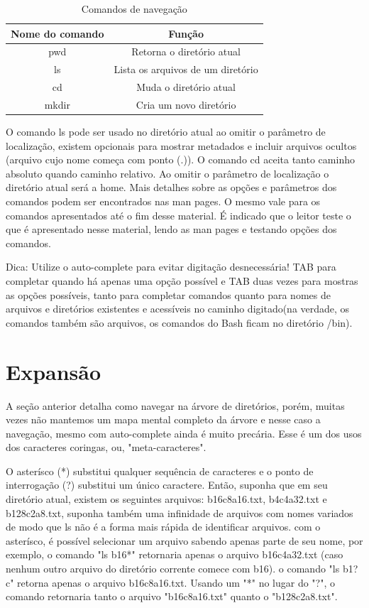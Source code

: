 \documentclass[oneside, 11 pt]{article}
\begin{document}
	\begin{table}[!ht]
		\centering
		\begin{tabular}{ | c | c | } 
			\hline
			\bfseries Nome do comando & \bfseries Função \\
			\hline
			pwd & Retorna o diretório atual \\
			\hline
			ls & Lista os arquivos de um diretório \\
			\hline
			cd & Muda o diretório atual \\
			\hline
			mkdir & Cria um novo diretório \\
			\hline
		\end{tabular}
		\caption{Comandos de navegação}
		\label{table:1}
	\end{table}
	O comando ls pode ser usado no diretório atual ao omitir o parâmetro de localização, existem opcionais para mostrar metadados e incluir arquivos ocultos (arquivo cujo nome começa com ponto (.)). O comando cd aceita tanto caminho absoluto quando caminho relativo. Ao omitir o parâmetro de localização o diretório atual será a home. Mais detalhes sobre as opções e parâmetros dos comandos podem ser encontrados nas man pages. O mesmo vale para os comandos apresentados até o fim desse material. É indicado que o leitor teste o que é apresentado nesse material, lendo as man pages e testando opções dos comandos.
	
	Dica: Utilize o auto-complete para evitar digitação desnecessária! TAB para completar quando há apenas uma opção possível e TAB duas vezes para mostras as opções possíveis, tanto para completar comandos quanto para nomes de arquivos e diretórios existentes e acessíveis no caminho digitado(na verdade, os comandos também são arquivos, os comandos do Bash ficam no diretório /bin).
	\section{Expansão}
	A seção anterior detalha como navegar na árvore de diretórios, porém, muitas vezes não mantemos um mapa mental completo da árvore e nesse caso a navegação, mesmo com auto-complete ainda é muito precária. Esse é um dos usos dos caracteres coringas, ou, "meta-caracteres".
	
	O asterísco (*) substitui qualquer sequência de caracteres e o ponto de interrogação (?) substitui um único caractere. Então, suponha que em seu diretório atual, existem os seguintes arquivos: b16c8a16.txt, b4c4a32.txt e b128c2a8.txt, suponha também uma infinidade de arquivos com nomes variados de modo que ls não é a forma mais rápida de identificar arquivos. com o asterísco, é possível selecionar um arquivo sabendo apenas parte de seu nome, por exemplo, o comando "ls b16*" retornaria apenas o arquivo b16c4a32.txt (caso nenhum outro arquivo do diretório corrente comece com b16). o comando "ls b1?c" retorna apenas o arquivo b16c8a16.txt. Usando um "*" no lugar do "?", o comando retornaria tanto o arquivo "b16c8a16.txt" quanto o "b128c2a8.txt".
	
\end{document}
